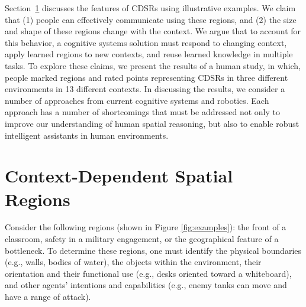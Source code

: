 \documentclass[11pt,letterpaper]{article}
\begin{document}
Section~\ref{sec:cdsrs} discusses the features of CDSRs using illustrative examples.  We claim that (1) people can effectively communicate using these regions, and (2) the size and shape of these regions change with the context.  We argue that to account for this behavior, a cognitive systems solution must respond to changing context, apply learned regions to new contexts, and reuse learned knowledge in multiple tasks.  To explore these claims, we present the results of a human study, in which, people marked regions and rated points representing CDSRs in three different environments in 13 different contexts.  In discussing the results, we consider a number of approaches from current cognitive systems and robotics.  Each approach has a number of shortcomings that must be addressed not only to improve our understanding of human spatial reasoning, but also to enable robust intelligent assistants in human environments.

\section{Context-Dependent Spatial Regions}\label{sec:cdsrs}

Consider the following regions (shown in Figure \ref{fig:examples}): the front of a classroom, safety in a military engagement, or the geographical feature of a bottleneck.  To determine these regions, one must identify the physical boundaries (e.g., walls, bodies of water), the objects within the environment, their orientation and their functional use (e.g., desks oriented toward a whiteboard), and other agents' intentions and capabilities (e.g., enemy tanks can move and have a range of attack).%
\end{document}
